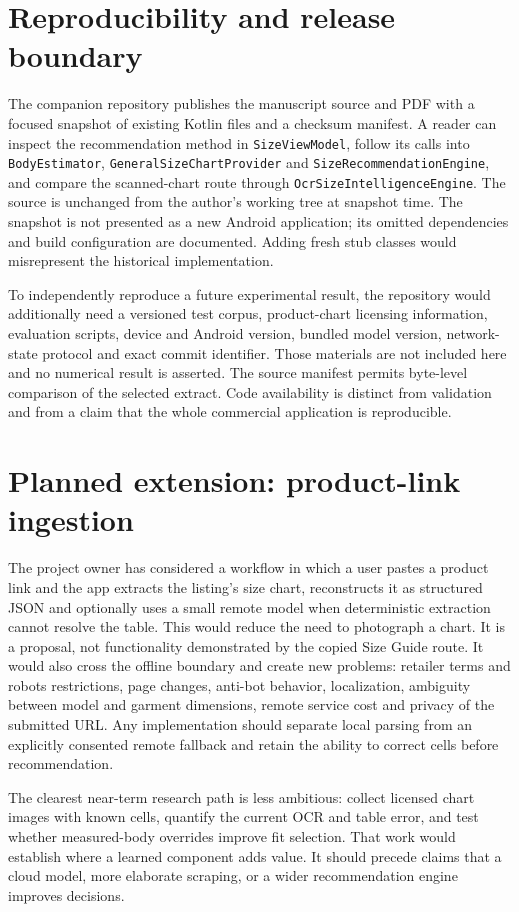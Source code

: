 \documentclass[11pt,a4paper]{article}
\begin{document}
\section{Reproducibility and release boundary}
The companion repository publishes the manuscript source and PDF with a focused snapshot of existing Kotlin files and a checksum manifest. A reader can inspect the recommendation method in \texttt{SizeViewModel}, follow its calls into \texttt{BodyEstimator}, \texttt{GeneralSizeChartProvider} and \texttt{SizeRecommendationEngine}, and compare the scanned-chart route through \texttt{OcrSizeIntelligenceEngine}. The source is unchanged from the author's working tree at snapshot time. The snapshot is not presented as a new Android application; its omitted dependencies and build configuration are documented. Adding fresh stub classes would misrepresent the historical implementation.

To independently reproduce a future experimental result, the repository would additionally need a versioned test corpus, product-chart licensing information, evaluation scripts, device and Android version, bundled model version, network-state protocol and exact commit identifier. Those materials are not included here and no numerical result is asserted. The source manifest permits byte-level comparison of the selected extract. Code availability is distinct from validation and from a claim that the whole commercial application is reproducible.

\section{Planned extension: product-link ingestion}
The project owner has considered a workflow in which a user pastes a product link and the app extracts the listing's size chart, reconstructs it as structured JSON and optionally uses a small remote model when deterministic extraction cannot resolve the table. This would reduce the need to photograph a chart. It is a proposal, not functionality demonstrated by the copied Size Guide route. It would also cross the offline boundary and create new problems: retailer terms and robots restrictions, page changes, anti-bot behavior, localization, ambiguity between model and garment dimensions, remote service cost and privacy of the submitted URL. Any implementation should separate local parsing from an explicitly consented remote fallback and retain the ability to correct cells before recommendation.

The clearest near-term research path is less ambitious: collect licensed chart images with known cells, quantify the current OCR and table error, and test whether measured-body overrides improve fit selection. That work would establish where a learned component adds value. It should precede claims that a cloud model, more elaborate scraping, or a wider recommendation engine improves decisions.
\end{document}
